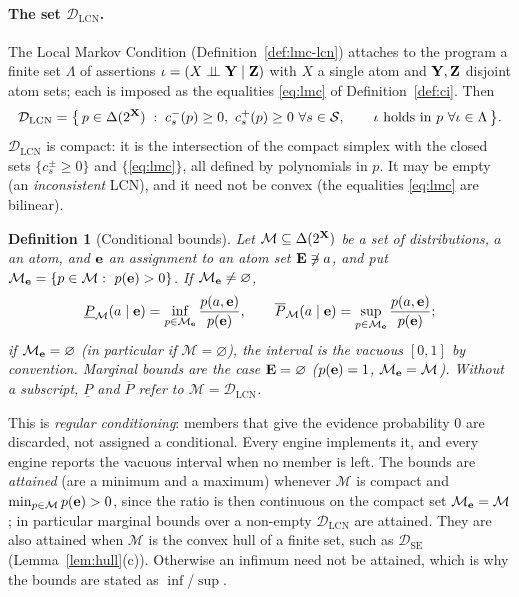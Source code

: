 \documentclass{article} %
\newtheorem{definition}{Definition}
\newcommand{\lo}{\underline}
\newcommand{\hi}{\overline}
\newcommand{\indep}{\perp\!\!\!\perp}
\newcommand{\DSE}{\mathcal{D}_{\mathrm{SE}}}
\newcommand{\DLCN}{\mathcal{D}_{\mathrm{LCN}}}
\begin{document}
\paragraph{The set $\DLCN$.}
The Local Markov Condition (Definition~\ref{def:lmc-lcn}) attaches to the program
a finite set $\Lambda$ of assertions $\iota=(X\indep\bY\mid\bZ)$ with $X$ a single
atom and $\mathbf{Y},\mathbf{Z}$ disjoint atom sets; each is imposed as the equalities
\eqref{eq:lmc} of Definition~\ref{def:ci}. Then
\begin{equation}\label{eq:dlcn-app}
  \DLCN=\bigl\{\,p\in\Delta(2^{\bX})\;:\;
    c_s^-(p)\ge0,\ c_s^+(p)\ge0\ \forall s\in\cS,\qquad \iota\text{ holds in }p\ \forall \iota\in\Lambda\,\bigr\}.
\end{equation}
$\DLCN$ is compact: it is the intersection of the compact simplex with the
closed sets $\{c^\pm_s\ge0\}$ and $\{$\eqref{eq:lmc}$\}$, all defined by
polynomials in $p$. It may be empty (an \emph{inconsistent} LCN), and it need
not be convex (the equalities \eqref{eq:lmc} are bilinear).

\begin{definition}[Conditional bounds]\label{def:cond}
Let $\mathcal M\subseteq\Delta(2^{\mathbf{X}})$ be a set of distributions, $a$ an atom,
and $\mathbf{e}$ an assignment to an atom set $\mathbf{E}\not\ni a$, and put
$\mathcal M_{\be}=\{p\in\mathcal M:\ p(\be)>0\}$. If $\mathcal M_{\mathbf{e}}\neq\varnothing$,
\[
  \lo P_{\mathcal M}(a\mid\be)=\inf_{p\in\mathcal M_{\be}}\frac{p(a,\be)}{p(\be)},
  \qquad
  \hi P_{\mathcal M}(a\mid\be)=\sup_{p\in\mathcal M_{\be}}\frac{p(a,\be)}{p(\be)};
\]
if $\mathcal M_{\mathbf{e}}=\varnothing$ (in particular if $\mathcal M=\varnothing$), the
interval is the vacuous $[0,1]$ by convention. Marginal bounds are the case
$\mathbf{E}=\varnothing$ ($p(\mathbf{e})=1$, $\mathcal M_{\mathbf{e}}=\mathcal M$). Without a
subscript, $\lo P$ and $\hi P$ refer to $\mathcal M=\DLCN$.
\end{definition}

This is \emph{regular conditioning}: members that give the evidence probability
$0$ are discarded, not assigned a conditional. Every engine implements it, and
every engine reports the vacuous interval when no member is left. The bounds are
\emph{attained} (are a minimum and a maximum) whenever $\mathcal M$ is compact and
$\min_{p\in\mathcal M}p(\mathbf{e})>0$, since the ratio is then continuous on the compact
set $\mathcal M_{\mathbf{e}}=\mathcal M$; in particular marginal bounds over a non-empty
$\DLCN$ are attained. They are also attained when $\mathcal M$ is the convex hull
of a finite set, such as $\DSE$ (Lemma~\ref{lem:hull}(c)). Otherwise an infimum
need not be attained, which is why the bounds are stated as $\inf$/$\sup$.
\end{document}
